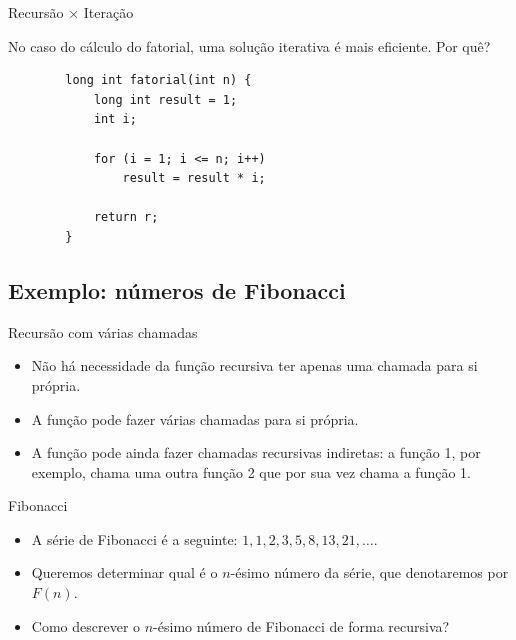 \documentclass[handout]{beamer}
\begin{document}
\begin{frame}[fragile]{Recursão $\times$ Iteração}

    No caso do cálculo do fatorial, uma solução iterativa é mais eficiente. Por quê?
    \begin{verbatim}
        long int fatorial(int n) {
            long int result = 1;
            int i;

            for (i = 1; i <= n; i++)
                result = result * i;

            return r;
        }
    \end{verbatim}
\end{frame}


\subsection{Exemplo: números de Fibonacci}

\begin{frame}[fragile]{Recursão com várias chamadas}

    \begin{itemize}[<+->]
        \item Não há necessidade da função recursiva ter apenas uma chamada para si própria.
        \item A função pode fazer várias chamadas para si própria.
        \item A função pode ainda fazer chamadas recursivas indiretas: a função 1, por exemplo, chama uma outra função 2 que por sua vez chama a função 1.
    \end{itemize}
\end{frame}

\begin{frame}[fragile]{Fibonacci}

    \begin{itemize}
        \item A série de Fibonacci é a seguinte: $1, 1, 2, 3, 5, 8, 13, 21, \ldots$.
        \item Queremos determinar qual é o $n$-ésimo número da série, que denotaremos por $F(n)$.
        \item Como descrever o $n$-ésimo número de Fibonacci de forma recursiva?
    \end{itemize}
\end{frame}
\end{document}
